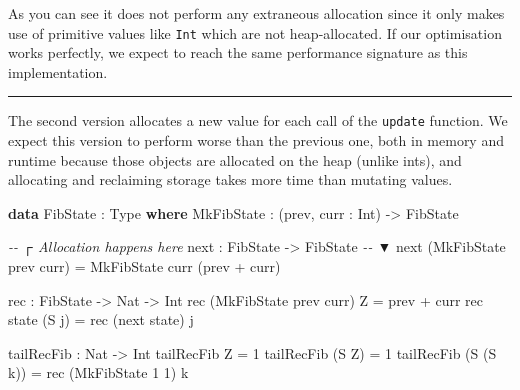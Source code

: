 \documentclass[
]{article}
\newenvironment{Shaded}{}{}
\newcommand{\CommentTok}[1]{\textcolor[rgb]{0.38,0.63,0.69}{\textit{#1}}}
\newcommand{\DataTypeTok}[1]{\textcolor[rgb]{0.56,0.13,0.00}{#1}}
\newcommand{\DecValTok}[1]{\textcolor[rgb]{0.25,0.63,0.44}{#1}}
\newcommand{\KeywordTok}[1]{\textcolor[rgb]{0.00,0.44,0.13}{\textbf{#1}}}
\newcommand{\NormalTok}[1]{#1}
\newcommand{\OperatorTok}[1]{\textcolor[rgb]{0.40,0.40,0.40}{#1}}
\newcommand{\OtherTok}[1]{\textcolor[rgb]{0.00,0.44,0.13}{#1}}
\begin{document}
As you can see it does not perform any extraneous allocation since it
only makes use of primitive values like \texttt{Int} which are not
heap-allocated. If our optimisation works perfectly, we expect to reach
the same performance signature as this implementation.

\begin{center}\rule{0.5\linewidth}{0.5pt}\end{center}

The second version allocates a new value for each call of the
\texttt{update} function. We expect this version to perform worse than
the previous one, both in memory and runtime because those objects are
allocated on the heap (unlike ints), and allocating and reclaiming
storage takes more time than mutating values.

\begin{Shaded}
\begin{Highlighting}[]
\KeywordTok{data} \DataTypeTok{FibState} \OperatorTok{:} \DataTypeTok{Type} \KeywordTok{where}
  \DataTypeTok{MkFibState} \OperatorTok{:}\NormalTok{ (prev, curr }\OperatorTok{:}  \DataTypeTok{Int}\NormalTok{) }\OtherTok{{-}\textgreater{}} \DataTypeTok{FibState}

                            \CommentTok{{-}{-}   ┌ Allocation happens here}
\NormalTok{next }\OperatorTok{:} \DataTypeTok{FibState} \OtherTok{{-}\textgreater{}} \DataTypeTok{FibState} \CommentTok{{-}{-}   ▼}
\NormalTok{next (}\DataTypeTok{MkFibState}\NormalTok{ prev curr) }\OtherTok{=} \DataTypeTok{MkFibState}\NormalTok{ curr (prev }\OperatorTok{+}\NormalTok{ curr)}

\NormalTok{rec }\OperatorTok{:} \DataTypeTok{FibState} \OtherTok{{-}\textgreater{}} \DataTypeTok{Nat} \OtherTok{{-}\textgreater{}} \DataTypeTok{Int}
\NormalTok{rec (}\DataTypeTok{MkFibState}\NormalTok{ prev curr) }\DataTypeTok{Z} \OtherTok{=}\NormalTok{ prev }\OperatorTok{+}\NormalTok{ curr}
\NormalTok{rec state (}\DataTypeTok{S}\NormalTok{ j) }\OtherTok{=}\NormalTok{ rec (next state) j}

\NormalTok{tailRecFib }\OperatorTok{:} \DataTypeTok{Nat} \OtherTok{{-}\textgreater{}} \DataTypeTok{Int}
\NormalTok{tailRecFib }\DataTypeTok{Z} \OtherTok{=} \DecValTok{1}
\NormalTok{tailRecFib (}\DataTypeTok{S} \DataTypeTok{Z}\NormalTok{) }\OtherTok{=} \DecValTok{1}
\NormalTok{tailRecFib (}\DataTypeTok{S}\NormalTok{ (}\DataTypeTok{S}\NormalTok{ k)) }\OtherTok{=}\NormalTok{ rec (}\DataTypeTok{MkFibState} \DecValTok{1} \DecValTok{1}\NormalTok{) k}
\end{Highlighting}
\end{Shaded}
\end{document}
